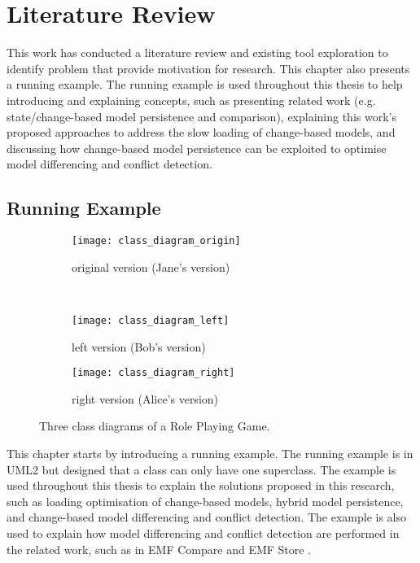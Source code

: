 \chapter{Literature Review}
\label{ch:literature_review}
This work has conducted a literature review and existing tool exploration to 
identify problem that provide motivation for research. This chapter also presents a running example. The running example is used throughout this thesis to help introducing and explaining concepts, such as presenting related work (e.g. state/change-based model persistence and comparison), explaining this work's proposed approaches to address the slow loading of change-based models, and discussing how change-based model persistence can be exploited to optimise model differencing and conflict detection.

\section{Running Example}
\label{sec:running_example_1}

\begin{figure}[ht]
  \centering
  \begin{subfigure}[t]{0.45\linewidth}
    \texttt{[image: class\_diagram\_origin]}
    \caption{original version (Jane's version)}
    \label{fig:class_diagram_origin}
  \end{subfigure}
  \\
  \begin{subfigure}[t]{0.45\linewidth}
    \texttt{[image: class\_diagram\_left]}
    \caption{left version (Bob's version)}
    \label{fig:class_diagram_left}
  \end{subfigure}
  \hfill
  \begin{subfigure}[t]{0.45\linewidth}
    \texttt{[image: class\_diagram\_right]}
    \caption{right version (Alice's version)}
    \label{fig:class_diagram_right}
  \end{subfigure}
  \caption{Three class diagrams of a Role Playing Game.}
  \label{fig:class_diagram_rpg}
\end{figure}

This chapter starts by introducing a running example. The running example is in UML2 but designed that a class can only have one superclass. The example is used throughout this thesis to explain the solutions proposed in this research, such as loading optimisation of change-based models, hybrid model persistence, and change-based model differencing and conflict detection. The example is also used to explain how model differencing and conflict detection are performed in the related work, such as in EMF Compare \cite{emfcompare2018developer} and EMF Store \cite{emfstore2019what}. 

